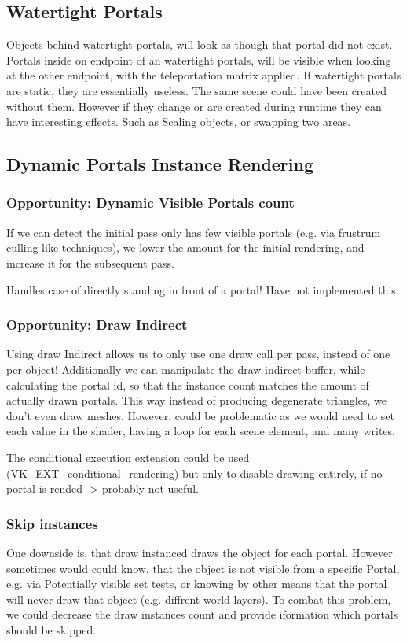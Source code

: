\subsection{Watertight Portals}
Objects behind watertight portals, will look as though that portal did not exist. Portals inside on endpoint of an watertight portals, will be visible when looking at the other endpoint, with the teleportation matrix applied. If watertight portals are static, they are essentially useless. The same scene could have been created without them.
However if they change or are created during runtime they can have interesting effects. Such as Scaling objects, or swapping two areas.

\subsection{Dynamic Portals Instance Rendering}

\subsubsection{Opportunity: Dynamic Visible Portals count}
If we can detect the initial pass only has few visible portals (e.g. via frustrum culling like techniques), we lower the amount for the initial rendering, and increase it for
the subsequent pass.

Handles case of directly standing in front of a portal!
Have not implemented this

\subsubsection{Opportunity: Draw Indirect}
Using draw Indirect allows us to only use one draw call per pass, instead of one per object!
Additionally we can manipulate the draw indirect buffer, while calculating the portal id, so that the instance count matches the amount of actually drawn portals.
This way instead of producing degenerate triangles, we don't even draw meshes.
However, could be problematic as we would need to set each value in the shader, having a loop for each scene element, and many writes.

The conditional execution extension could be used (VK\_EXT\_conditional\_rendering) but only to disable drawing entirely, if no portal is rended -> probably not useful.

\subsubsection{Skip instances}
One downside is, that draw instanced draws the object for each portal. However sometimes would could know, that the object is not visible from a specific Portal, e.g. via Potentially visible set tests, or knowing by other means that the portal will never draw that object (e.g. diffrent world layers).
To combat this problem, we could decrease the draw instances count and provide iformation which portals should be skipped.

